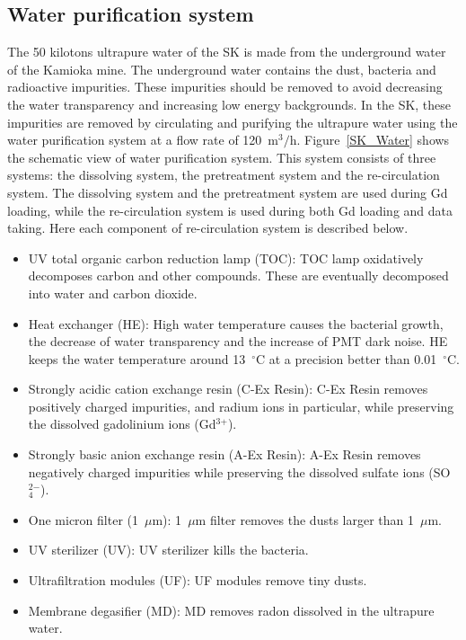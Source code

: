 \subsection{Water purification system}\label{Section_WaterPuri}
\vs\hs
The 50 kilotons ultrapure water of the SK is made from the underground water of the Kamioka mine.
The underground water contains the dust, bacteria and radioactive impurities.
These impurities should be removed to avoid decreasing the water transparency and increasing low energy backgrounds.
In the SK, these impurities are removed by circulating and purifying the ultrapure water using the water purification system at a flow rate of 120~m$^{\text{3}}/$h.
Figure~\ref{SK_Water} shows the schematic view of water purification system.
This system consists of three systems: the dissolving system, the pretreatment system and the re-circulation system.
The dissolving system and the pretreatment system are used during Gd loading, while the re-circulation system is used during both Gd loading and data taking.
Here each component of re-circulation system is described below.
\begin{itemize}
	\item UV total organic carbon reduction lamp (TOC): TOC lamp oxidatively decomposes carbon and other compounds. These are eventually decomposed into water and carbon dioxide.
	\item Heat exchanger (HE): High water temperature causes the bacterial growth, the decrease of water transparency and the increase of PMT dark noise. HE keeps the water temperature around 13~$^{\circ}$C at a precision better than 0.01~$^{\circ}$C.
	\item Strongly acidic cation exchange resin (C-Ex Resin): C-Ex Resin removes positively charged impurities, and radium ions in particular, while preserving the dissolved gadolinium ions (Gd$^{\text{3}+}$).
	\item Strongly basic anion exchange resin (A-Ex Resin): A-Ex Resin removes negatively charged impurities while preserving the dissolved sulfate ions (SO$^{\text{2}-}_{\text{4}}$).
	\item One micron filter (1~$\mu$m): 1~$\mu$m filter removes the dusts larger than 1~$\mu$m.
	\item UV sterilizer (UV): UV sterilizer kills the bacteria.
	\item Ultrafiltration modules (UF): UF modules remove tiny dusts.
	\item Membrane degasifier (MD): MD removes radon dissolved in the ultrapure water.
\end{itemize}

